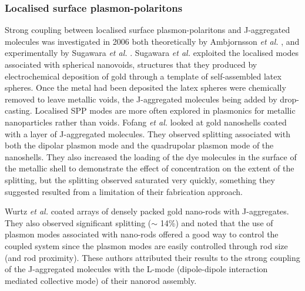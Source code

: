 \documentclass[12pt]{iopart}
\begin{document}
\subsubsection{Localised surface plasmon-polaritons} \label{Localized}

Strong coupling between localised surface plasmon-polaritons and J-aggregated molecules was investigated in 2006 both theoretically by Ambjornsson {\it et al.} \cite{Ambjornsson_PRB_2006_73_085412}, and experimentally by Sugawara {\it et al.} \cite{Sugawara2006}. Sugawara {\it et al.} exploited the localised modes associated with spherical nanovoids, structures that they produced by electrochemical deposition of gold through a template of self-assembled latex spheres. Once the metal had been deposited the latex spheres were chemically removed to leave metallic voids, the J-aggregated molecules being added by drop-casting. Localised SPP modes are more often explored in plasmonics for metallic nanoparticles rather than voids. Fofang {\it et al.} \cite{Fofang2008} looked at gold nanoshells coated with a layer of J-aggregated molecules. They observed splitting associated with both the dipolar plasmon mode and the quadrupolar plasmon mode of the nanoshells. They also increased the loading of the dye molecules in the surface of the metallic shell to demonstrate the effect of concentration on the extent of the splitting, but the splitting observed saturated very quickly, something they suggested resulted from a limitation of their fabrication approach. 

Wurtz {\it et al.}  \cite{Wurtz2007} coated arrays of densely packed gold nano-rods with J-aggregates. They also observed significant splitting ($\sim$ 14\%) and noted that the use of plasmon modes associated with nano-rods offered a good way to control the coupled system since the plasmon modes are easily controlled through rod size (and rod proximity). These authors attributed their results to the strong coupling of the J-aggregated molecules with the L-mode (dipole-dipole interaction mediated collective mode) of their nanorod assembly.
\end{document}
